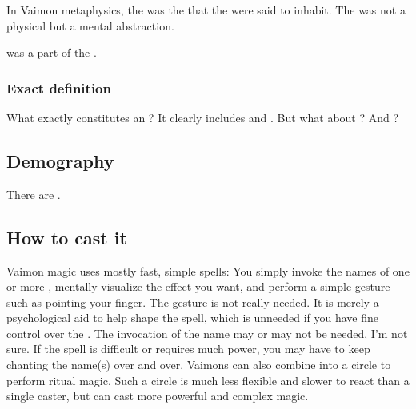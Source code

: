 \subsubsection{\Empyrean}
\index{\empyrean}
In Vaimon metaphysics, the \quo{\empyrean} was the  that the \Archons{} were said to inhabit. 
The \empyrean{} was not a physical  but a mental abstraction. 

 was a part of the \empyrean. 





\subsubsection{Exact definition}
What exactly constitutes an \Archon?
It clearly includes \sephiroth and \qliphoth.
But what about ? 
And \malachim?









\subsection{Demography}
There are . 









\subsection{How to cast it}
Vaimon magic uses mostly fast, simple  spells: 
You simply invoke the names of one or more \Archons, mentally visualize the effect you want, and perform a simple gesture such as pointing your finger. 
The gesture is not really needed. 
It is merely a psychological aid to help shape the spell, which is unneeded if you have fine control over the \Archons. 
The invocation of the name may or may not be needed, I'm not sure. If the spell is difficult or requires much power, you may have to keep chanting the name(s) over and over. 
Vaimons can also combine into a circle to perform ritual magic. Such a circle is much less flexible and slower to react than a single caster, but can cast more powerful and complex magic. 






